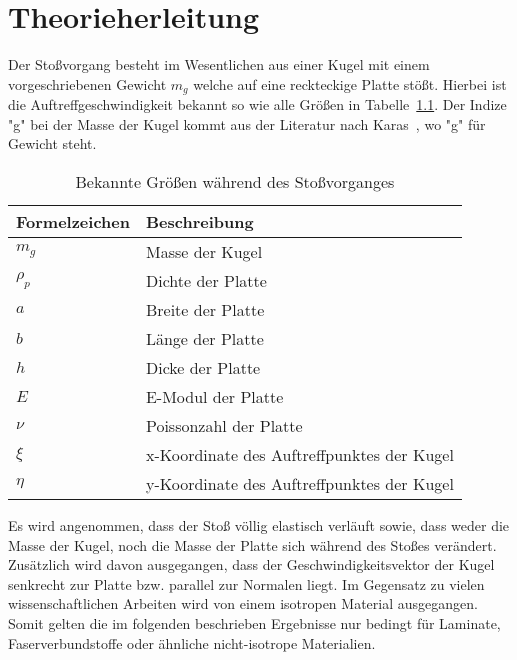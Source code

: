 \chapter{Theorieherleitung}
\label{chap:Principles}

Der Stoßvorgang besteht im Wesentlichen aus einer Kugel mit einem vorgeschriebenen Gewicht $m_g$ welche auf eine reckteckige Platte stößt. Hierbei ist die Auftreffgeschwindigkeit bekannt so wie alle Größen in Tabelle~\ref{tab:TheorieVariablen}. Der Indize "g" bei der Masse der Kugel kommt aus der Literatur nach Karas~\cite{Karas.1939}, wo "g" für Gewicht steht. 

\begin{table}[h!]
	\begin{center}
		\caption{Bekannte Größen während des Stoßvorganges}
		\label{tab:TheorieVariablen}
		
		\begin{tabular}[h]{l | l}	
			Formelzeichen & Beschreibung \\
			\hline
			$m_g$ & Masse der Kugel \\
			$\rho_p$ & Dichte der Platte\\
			$a$ & Breite der Platte\\
			$b$ & Länge der Platte\\
			$h$ & Dicke der Platte \\
			$E$ & E-Modul der Platte \\
			$\nu$ & Poissonzahl der Platte \\
			$\xi$ & x-Koordinate des Auftreffpunktes der Kugel \\
			$\eta$ & y-Koordinate des Auftreffpunktes der Kugel \\
		\end{tabular}
		
	\end{center}
\end{table}


Es wird angenommen, dass der Stoß völlig elastisch verläuft sowie, dass weder die Masse der Kugel, noch die Masse der Platte sich während des Stoßes verändert.
Zusätzlich wird davon ausgegangen, dass der Geschwindigkeitsvektor der Kugel senkrecht zur Platte bzw. parallel zur Normalen liegt. Im Gegensatz zu vielen wissenschaftlichen Arbeiten wird von einem isotropen Material ausgegangen. Somit gelten die im folgenden beschrieben Ergebnisse nur bedingt für Laminate, Faserverbundstoffe oder ähnliche nicht-isotrope Materialien. 

